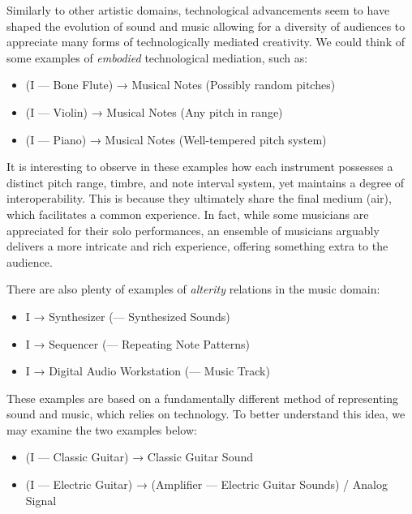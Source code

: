 Similarly to other artistic domains, technological advancements seem to have shaped the evolution of sound and music allowing for a diversity of audiences to appreciate many forms of technologically mediated creativity. We could think of some examples of \emph{embodied} technological mediation, such as:

\begin{itemize}
	\singlespacing
	\item (I --- Bone Flute) → Musical Notes (Possibly random pitches)
	\item (I --- Violin) → Musical Notes (Any pitch in range)
	\item (I --- Piano) → Musical Notes (Well-tempered pitch system)
\end{itemize}

It is interesting to observe in these examples how each instrument possesses a distinct pitch range, timbre, and note interval system, yet maintains a degree of interoperability. This is because they ultimately share the final medium (air), which facilitates a common experience. In fact, while some musicians are appreciated for their solo performances, an ensemble of musicians arguably delivers a more intricate and rich experience, offering something extra to the audience.

There are also plenty of examples of \emph{alterity} relations in the music domain:

\begin{itemize}
	\singlespacing
	\item I → Synthesizer (--- Synthesized Sounds)
	\item I → Sequencer (--- Repeating Note Patterns)
	\item I → Digital Audio Workstation (--- Music Track)
\end{itemize}

These examples are based on a fundamentally different method of representing sound and music, which relies on technology.
To better understand this idea, we may examine the two examples below:


\begin{itemize}
	\singlespacing
	\item (I --- Classic Guitar) → Classic Guitar Sound
	\item (I --- Electric Guitar) → (Amplifier --- Electric Guitar Sounds) / Analog Signal
\end{itemize}

